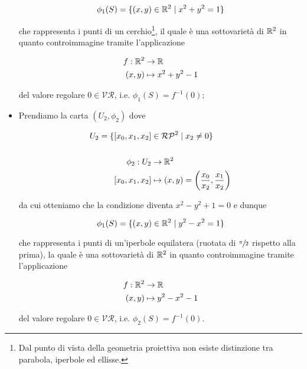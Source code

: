 \begin{itemize}
	\begin{equation}
		\phi_{1}(S) = \{ (x,y) \in \mathbb{R}^{2} \mid x^{2} + y^{2} = 1 \}
	\end{equation}
	
	che rappresenta i punti di un cerchio\footnote{%
		Dal punto di vista della geometria proiettiva non esiste distinzione tra parabola, iperbole ed ellisse.%
	}, il quale è una sottovarietà di $ \mathbb{R}^{2} $ in quanto controimmagine tramite l'applicazione
	
	\begin{align}
		\begin{split}
			f : \mathbb{R}^{2} &\to \mathbb{R}\\
			(x,y) &\mapsto x^{2} + y^{2} - 1
		\end{split}
	\end{align}
	
	del valore regolare $ 0 \in \mathcal{VR} $, i.e. $ \phi_{1}(S) = f^{-1}(0) $;
	
	\item Prendiamo la carta $ (U_{2},\phi_{2}) $ dove
	
	\begin{align}
		\begin{split}
			U_{2} = \{ [x_{0},x_{1},x_{2}] &\in \mathcal{RP}^{2} \mid x_{2} \neq 0 \}\\\\
			\phi_{2} : U_{2} &\to \mathbb{R}^{2}\\
			[x_{0},x_{1},x_{2}] &\mapsto (x,y) = \left( \dfrac{x_{0}}{x_{2}}, \dfrac{x_{1}}{x_{2}} \right)
		\end{split}
	\end{align}
	
	da cui otteniamo che la condizione diventa $ x^{2} - y^{2} + 1 = 0 $ e dunque
	
	\begin{equation}
		\phi_{1}(S) = \{ (x,y) \in \mathbb{R}^{2} \mid y^{2} - x^{2} = 1 \}
	\end{equation}
	
	che rappresenta i punti di un'iperbole equilatera (ruotata di $ \sfrac{\pi}{2} $ rispetto alla prima), la quale è una sottovarietà di $ \mathbb{R}^{2} $ in quanto controimmagine tramite l'applicazione
	
	\begin{align}
		\begin{split}
			f : \mathbb{R}^{2} &\to \mathbb{R}\\
			(x,y) &\mapsto y^{2} - x^{2} - 1
		\end{split}
	\end{align}
	
	del valore regolare $ 0 \in \mathcal{VR} $, i.e. $ \phi_{2}(S) = f^{-1}(0) $.
\end{itemize}

